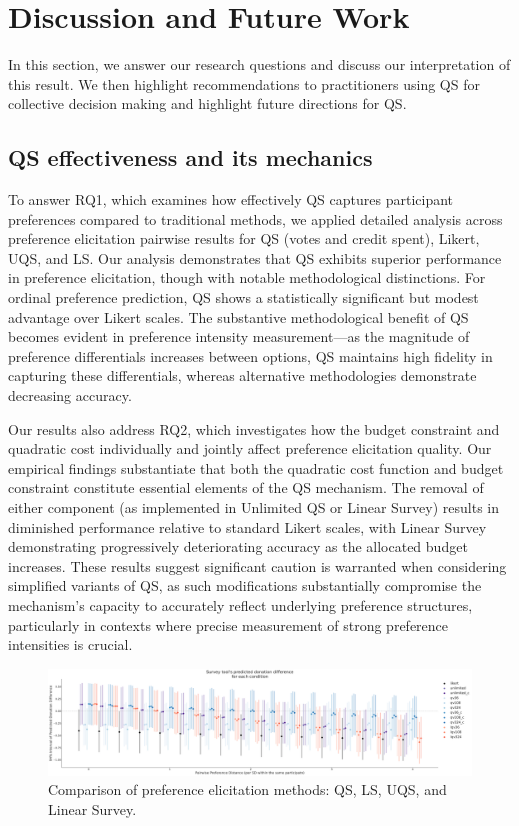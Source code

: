 \section{Discussion and Future Work}
\label{sec:discussion}
In this section, we answer our research questions and discuss our interpretation of this result. We then highlight recommendations to practitioners using QS for collective decision making and highlight future directions for QS.

\subsection{QS effectiveness and its mechanics}
To answer RQ1, which examines how effectively QS captures participant preferences compared to traditional methods, we applied detailed analysis across preference elicitation pairwise results for QS (votes and credit spent), Likert, UQS, and LS. Our analysis demonstrates that QS exhibits superior performance in preference elicitation, though with notable methodological distinctions. For ordinal preference prediction, QS shows a statistically significant but modest advantage over Likert scales. The substantive methodological benefit of QS becomes evident in preference intensity measurement—as the magnitude of preference differentials increases between options, QS maintains high fidelity in capturing these differentials, whereas alternative methodologies demonstrate decreasing accuracy.

Our results also address RQ2, which investigates how the budget constraint and quadratic cost individually and jointly affect preference elicitation quality. Our empirical findings substantiate that both the quadratic cost function and budget constraint constitute essential elements of the QS mechanism. The removal of either component (as implemented in Unlimited QS or Linear Survey) results in diminished performance relative to standard Likert scales, with Linear Survey demonstrating progressively deteriorating accuracy as the allocated budget increases. These results suggest significant caution is warranted when considering simplified variants of QS, as such modifications substantially compromise the mechanism's capacity to accurately reflect underlying preference structures, particularly in contexts where precise measurement of strong preference intensities is crucial.

\begin{figure}[h]
    \centering
    \includegraphics[width=\textwidth]{content/image/Predicted_Donation_Diff_Interval.pdf}
    \caption{Comparison of preference elicitation methods: QS, LS, UQS, and Linear Survey.}
    \label{fig:comparison}
\end{figure}

